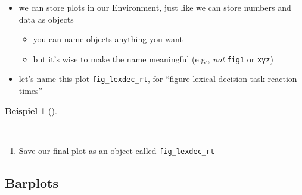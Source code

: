 \documentclass[
  letterpaper,
  DIV=11]{scrartcl}
\providecommand{\tightlist}{%
  \setlength{\itemsep}{0pt}\setlength{\parskip}{0pt}}\usepackage{longtable,booktabs,array}
\theoremstyle{definition}
\newtheorem{example}{Beispiel}[section]
\theoremstyle{remark}
\begin{document}
\begin{itemize}
\tightlist
\item
  we can store plots in our Environment, just like we can store numbers
  and data as objects

  \begin{itemize}
  \tightlist
  \item
    you can name objects anything you want
  \item
    but it's wise to make the name meaningful (e.g., \emph{not}
    \texttt{fig1} or \texttt{xyz})
  \end{itemize}
\item
  let's name this plot \texttt{fig\_lexdec\_rt}, for ``figure lexical
  decision task reaction times''
\end{itemize}

\begin{tcolorbox}[enhanced jigsaw, colbacktitle=quarto-callout-tip-color!10!white, rightrule=.15mm, toptitle=1mm, bottomtitle=1mm, breakable, leftrule=.75mm, toprule=.15mm, left=2mm, coltitle=black, opacitybacktitle=0.6, title=\textcolor{quarto-callout-tip-color}{\faLightbulb}\hspace{0.5em}{Aufgabe~\ref{exm-save}: \texttt{ggplot2} review}, colback=white, titlerule=0mm, arc=.35mm, bottomrule=.15mm, opacityback=0, colframe=quarto-callout-tip-color-frame]

\begin{example}[]\protect\hypertarget{exm-save}{}\label{exm-save}

~

\begin{enumerate}
\def\labelenumi{\arabic{enumi}.}
\tightlist
\item
  Save our final plot as an object called \texttt{fig\_lexdec\_rt}
\end{enumerate}

\end{example}

\end{tcolorbox}

\hypertarget{barplots}{%
\subsection{Barplots}\label{barplots}}
\end{document}
